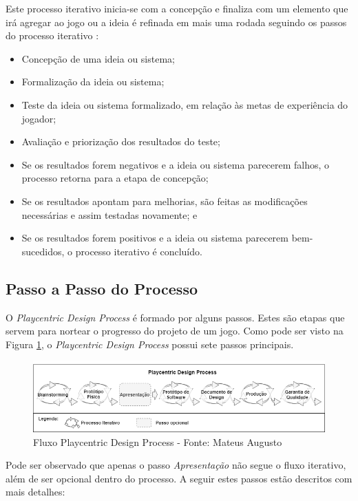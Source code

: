 Este processo iterativo inicia-se com a concepção e finaliza com um elemento que irá agregar ao jogo ou a ideia é refinada em mais uma rodada seguindo os passos do processo iterativo \cite[p. 14]{Fullerton_2008}: 

\begin{itemize}
    \item Concepção de uma ideia ou sistema;
    \item Formalização da ideia ou sistema;
    \item Teste da ideia ou sistema formalizado, em relação às metas de experiência do jogador;
    \item Avaliação e priorização dos resultados do teste;
    \item Se os resultados forem negativos e a ideia ou sistema parecerem falhos, o processo retorna para a etapa de concepção;
    \item Se os resultados apontam para melhorias, são feitas as modificações necessárias e assim testadas novamente; e
    \item Se os resultados forem positivos e a ideia ou sistema parecerem bem-sucedidos, o processo iterativo é concluído. 
\end{itemize}



\subsection{Passo a Passo do Processo}

O \textit{Playcentric Design Process} é formado por alguns passos. Estes são etapas que servem para nortear o progresso do projeto de um jogo. Como pode ser visto na Figura \ref{Fig:playcentric.png}, o \textit{Playcentric Design Process} possui sete passos principais. 

\begin{figure}[htbp]
	\centering
		\includegraphics[keepaspectratio=true,scale=0.58]{figuras/playcentrtic.png}
	\caption{\textcolor{textmodified}{Fluxo Playcentric Design Process - Fonte: Mateus Augusto}}
	\label{Fig:playcentric.png}
\end{figure}
\newpage
Pode ser observado que apenas o passo \textit{Apresentação} não segue o fluxo iterativo, além de ser opcional dentro do processo. A seguir estes passos estão descritos com mais detalhes:

